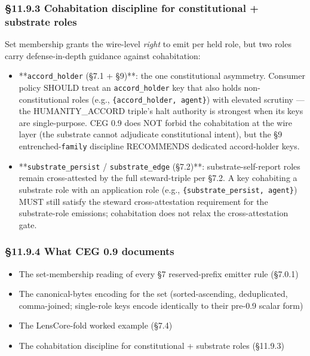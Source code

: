 \documentclass[11pt]{article}
\begin{document}
\subsubsection*{§11.9.3 Cohabitation discipline for constitutional + substrate roles}


Set membership grants the wire-level \textit{right} to emit per held role, but two roles carry defense-in-depth guidance against cohabitation:


\begin{itemize}\setlength\itemsep{0pt}
\item **\texttt{accord\_holder} (§7.1 + §9)**: the one constitutional asymmetry. Consumer policy SHOULD treat an \texttt{accord\_holder} key that also holds non-constitutional roles (e.g., \texttt{\{accord\_holder, agent\}}) with elevated scrutiny — the HUMANITY\_ACCORD triple's halt authority is strongest when its keys are single-purpose. CEG 0.9 does NOT forbid the cohabitation at the wire layer (the substrate cannot adjudicate constitutional intent), but the §9 entrenched-\texttt{family} discipline RECOMMENDS dedicated accord-holder keys.
\item **\texttt{substrate\_persist} / \texttt{substrate\_edge} (§7.2)**: substrate-self-report roles remain cross-attested by the full steward-triple per §7.2. A key cohabiting a substrate role with an application role (e.g., \texttt{\{substrate\_persist, agent\}}) MUST still satisfy the steward cross-attestation requirement for the substrate-role emissions; cohabitation does not relax the cross-attestation gate.
\end{itemize}


\subsubsection*{§11.9.4 What CEG 0.9 documents}


\begin{itemize}\setlength\itemsep{0pt}
\item The set-membership reading of every §7 reserved-prefix emitter rule (§7.0.1)
\item The canonical-bytes encoding for the set (sorted-ascending, deduplicated, comma-joined; single-role keys encode identically to their pre-0.9 scalar form)
\item The LensCore-fold worked example (§7.4)
\item The cohabitation discipline for constitutional + substrate roles (§11.9.3)
\end{itemize}
\end{document}
